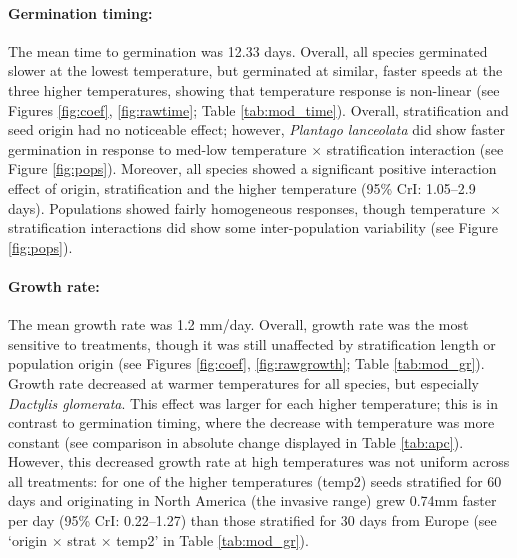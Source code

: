 \documentclass[12pt]{article}\usepackage[]{graphicx}\usepackage[]{color}
\begin{document}
	\paragraph{Germination timing:} The mean time to germination was 12.33 days.  Overall, all species germinated slower at the lowest temperature, but germinated at similar, faster speeds at the three higher temperatures, showing that temperature response is non-linear  (see Figures \ref{fig:coef}, \ref{fig:rawtime}; Table \ref{tab:mod_time}). Overall, stratification and seed origin had no noticeable effect; however, \textit{Plantago lanceolata} did show faster germination in response to med-low temperature $\times$ stratification interaction (see Figure \ref{fig:pops}).  Moreover, all species showed a significant positive interaction effect of origin, stratification and the higher temperature (95\% CrI: 1.05--2.9 days). 
	Populations showed fairly homogeneous responses, though temperature $\times$ stratification interactions did show some inter-population variability (see Figure \ref{fig:pops}). 
	\paragraph{Growth rate:} The mean growth rate was 1.2 mm/day. Overall, growth rate was the most sensitive to treatments, though it was still unaffected by stratification length or population origin (see Figures \ref{fig:coef}, \ref{fig:rawgrowth}; Table \ref{tab:mod_gr}). Growth rate decreased at warmer temperatures for all species, but especially \textit{Dactylis glomerata}. This effect was larger for each higher temperature; this is in contrast to germination timing, where the decrease with temperature was more constant (see comparison in absolute change displayed in Table \ref{tab:apc}). However, this decreased growth rate at high temperatures was not uniform across all treatments: for one of the higher temperatures (temp2) seeds stratified for 60 days and originating in North America (the invasive range) grew 0.74mm faster per day (95\% CrI: 0.22--1.27) than those stratified for 30 days from Europe (see `origin $\times$ strat $\times$ temp2' in Table \ref{tab:mod_gr}). 
\end{document}
